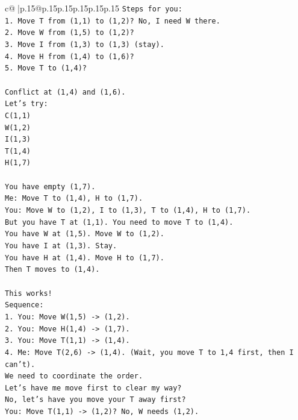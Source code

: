 \documentclass{article}
\begin{document}
{\begin{supertabular}{c@{$\;$}|p{.15\linewidth}@{}p{.15\linewidth}p{.15\linewidth}p{.15\linewidth}p{.15\linewidth}p{.15\linewidth}}
{{{\texttt{Steps for you:} \\
\texttt{1. Move T from (1,1) to (1,2)? No, I need W there.} \\
\texttt{2. Move W from (1,5) to (1,2)?} \\
\texttt{3. Move I from (1,3) to (1,3) (stay).} \\
\texttt{4. Move H from (1,4) to (1,6)?} \\
\texttt{5. Move T to (1,4)?} \\
\\ 
\texttt{Conflict at (1,4) and (1,6).} \\
\texttt{Let's try:} \\
\texttt{C(1,1)} \\
\texttt{W(1,2)} \\
\texttt{I(1,3)} \\
\texttt{T(1,4)} \\
\texttt{H(1,7)} \\
\\ 
\texttt{You have empty (1,7).} \\
\texttt{Me: Move T to (1,4), H to (1,7).} \\
\texttt{You: Move W to (1,2), I to (1,3), T to (1,4), H to (1,7).} \\
\texttt{But you have T at (1,1). You need to move T to (1,4).} \\
\texttt{You have W at (1,5). Move W to (1,2).} \\
\texttt{You have I at (1,3). Stay.} \\
\texttt{You have H at (1,4). Move H to (1,7).} \\
\texttt{Then T moves to (1,4).} \\
\\ 
\texttt{This works!} \\
\texttt{Sequence:} \\
\texttt{1. You: Move W(1,5) {-}> (1,2).} \\
\texttt{2. You: Move H(1,4) {-}> (1,7).} \\
\texttt{3. You: Move T(1,1) {-}> (1,4).} \\
\texttt{4. Me: Move T(2,6) {-}> (1,4). (Wait, you move T to 1,4 first, then I can't).} \\
\texttt{We need to coordinate the order.} \\
\texttt{Let's have me move first to clear my way?} \\
\texttt{No, let's have you move your T away first?} \\
\texttt{You: Move T(1,1) {-}> (1,2)? No, W needs (1,2).} \\
}}}
\end{supertabular}}
\end{document}
